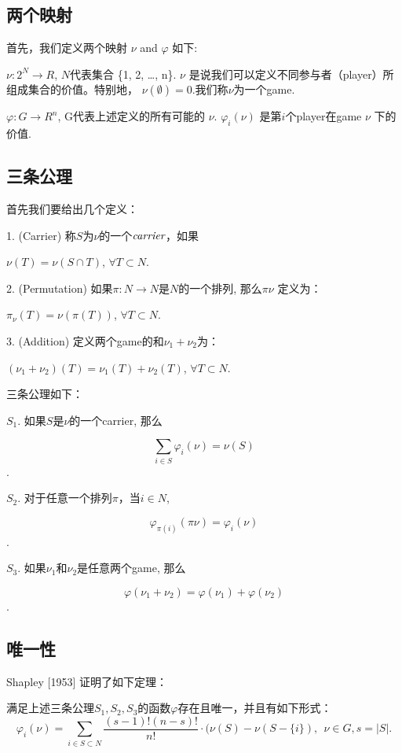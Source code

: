 \subsection{两个映射}\label{two maps}
首先，我们定义两个映射 $\nu$ and $\varphi$ 如下:

$\nu: 2^N \rightarrow R$, $N$代表集合 \{1, 2, \dots, n\}. $\nu$ 是说我们可以定义不同参与者（player）所组成集合的价值。特别地， $\nu(\emptyset)=0$.我们称$\nu$为一个game.

$\varphi: G \rightarrow R^n$, G代表上述定义的所有可能的 $\nu$.
$\varphi_i(\nu)$ 是第$i$个player在game $\nu$ 下的价值.


\subsection{三条公理}\label{three_axioms}
首先我们要给出几个定义：

1. (Carrier) 称$S$为$\nu$的一个$\emph{carrier}$，如果

$\nu(T)=\nu(S\cap T)$, $\forall T \subset N$.


2. (Permutation) 如果$\pi: N\rightarrow N$是$N$的一个排列, 那么$\pi\nu$ 定义为：

$\pi_\nu(T) = \nu(\pi(T))$, $\forall T \subset N$.

3. (Addition) 定义两个game的和$\nu_1+\nu_2$为：

$(\nu_1+\nu_2)(T) = \nu_1(T)+\nu_2(T)$, $\forall T \subset N$.

三条公理如下：

$S_1$. 如果$S$是$\nu$的一个carrier, 那么

$$\sum_{i \in S} \varphi_i(\nu) = \nu(S)$$.


$S_2$. 对于任意一个排列$\pi$，当$i \in N$,

$$\varphi_{\pi(i)}(\pi\nu) = \varphi_i(\nu)$$.

$S_3$. 如果$\nu_1$和$\nu_2$是任意两个game, 那么

$$\varphi(\nu_1+\nu_2) = \varphi(\nu_1)+\varphi(\nu_2)$$.

\subsection{唯一性}
Shapley [1953] 证明了如下定理：
\begin{theorem}
	满足上述三条公理$S_1, S_2, S_3$的函数$\varphi$存在且唯一，并且有如下形式：
	\begin{equation}
		\varphi_i(\nu) = \sum_{i\in S\subset N}\frac{(s-1)!(n-s)!}{n!}\cdot (\nu(S)-\nu(S-\{i\}), \ \ \nu \in G, s=|S|.
	\end{equation}\label{thm1}

\end{theorem}

